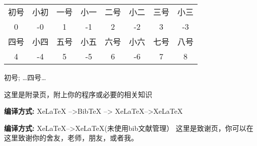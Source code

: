 \documentclass{LZUthesis}
\begin{document}
\begin{center}
 \begin{tabular}{cccccccc}
 \toprule
 初号 & 小初 & 一号 & 小一 & 二号 & 小二 & 三号 & 小三 \\
 0 & -0 & 1 & -1 & 2 & -2 & 3 & -3 \\
 \hline
 四号 & 小四 & 五号 & 小五 & 六号 & 小六 & 七号 & 八号 \\
 4 & -4 & 5 & -5 & 6 & -6 & 7 & 8 \\
 \bottomrule
 \end{tabular}
 \end{center}
{初号}; \dots {四号}\dots {}

\backmatter


\printbib




\Appendix


这里是附录页，附上你的程序或必要的相关知识\cite{partl2016}

{\bfseries 编译方式:} XeLaTeX -->BibTeX --> XeLaTeX-->XeLaTeX


{\bfseries 编译方式:}  XeLaTeX-->XeLaTeX(未使用bib文献管理）
\Thanks
这里是致谢页，你可以在这里致谢你的舍友，老师，朋友，或者我。





\Grade
\end{document}
